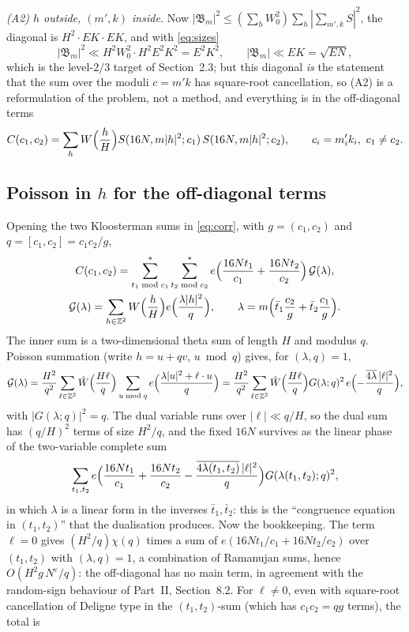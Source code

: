 \documentclass[11pt,a4paper]{article}
\theoremstyle{remark}
\theoremstyle{definition}
\newcommand{\Z}{\mathbb Z}
\newcommand{\e}{\varepsilon}
\begin{document}
\emph{(A2) $h$ outside, $(m',k)$ inside.} Now $|\mathfrak B_m|^2\le(\sum_hW_0^2)\sum_h|\sum_{m',k}S|^2$, the diagonal is $H^2\cdot EK\cdot EK$, and with \eqref{eq:sizes}
\[
|\mathfrak B_m|^2\ll H^2W_0^2\cdot H^2E^2K^2=E^2K^2,\qquad|\mathfrak B_m|\ll EK=\sqrt{EN},
\]
which is the level-$2/3$ target of Section~2.3; but this diagonal \emph{is} the statement that the sum over the moduli $c=m'k$ has square-root cancellation, so (A2) is a reformulation of the problem, not a method, and everything is in the off-diagonal terms
\begin{equation}\label{eq:corr}
C(c_1,c_2)=\sum_hW\Bigl(\frac hH\Bigr)S(16N,m|h|^2;c_1)\,S(16N,m|h|^2;c_2),\qquad c_i=m'_ik_i,\ c_1\ne c_2 .
\end{equation}

\subsection{Poisson in $h$ for the off-diagonal terms}
Opening the two Kloosterman sums in \eqref{eq:corr}, with $g=(c_1,c_2)$ and $q=[c_1,c_2]=c_1c_2/g$,
\begin{gather*}
C(c_1,c_2)=\sum_{t_1\bmod c_1}^*\sum_{t_2\bmod c_2}^*e\Bigl(\frac{16Nt_1}{c_1}+\frac{16Nt_2}{c_2}\Bigr)\,\mathcal G(\lambda),\\
\mathcal G(\lambda)=\sum_{h\in\Z^2}W\Bigl(\frac hH\Bigr)e\Bigl(\frac{\lambda|h|^2}{q}\Bigr),\qquad \lambda=m\Bigl(\bar t_1\frac{c_2}g+\bar t_2\frac{c_1}g\Bigr).
\end{gather*}
The inner sum is a two-dimensional theta sum of length $H$ and modulus $q$. Poisson summation (write $h=u+qv$, $u\bmod q$) gives, for $(\lambda,q)=1$,
\[
\mathcal G(\lambda)=\frac{H^2}{q^2}\sum_{\ell\in\Z^2}\hat W\Bigl(\frac{H\ell}q\Bigr)\sum_{u\bmod q}e\Bigl(\frac{\lambda|u|^2+\ell\cdot u}{q}\Bigr)=\frac{H^2}{q^2}\sum_{\ell\in\Z^2}\hat W\Bigl(\frac{H\ell}q\Bigr)G(\lambda;q)^2\,e\Bigl(-\frac{\overline{4\lambda}\,|\ell|^2}{q}\Bigr),
\]
with $|G(\lambda;q)|^2=q$. The dual variable runs over $|\ell|\ll q/H$, so the dual sum has $(q/H)^2$ terms of size $H^2/q$, and the fixed $16N$ survives as the linear phase of the two-variable complete sum
\[
\sum_{t_1,t_2}e\Bigl(\frac{16Nt_1}{c_1}+\frac{16Nt_2}{c_2}-\frac{\overline{4\lambda(t_1,t_2)}\,|\ell|^2}{q}\Bigr)G(\lambda(t_1,t_2);q)^2 ,
\]
in which $\lambda$ is a linear form in the inverses $\bar t_1,\bar t_2$: this is the ``congruence equation in $(t_1,t_2)$'' that the dualisation produces. Now the bookkeeping. The term $\ell=0$ gives $(H^2/q)\chi(q)$ times a sum of $e(16Nt_1/c_1+16Nt_2/c_2)$ over $(t_1,t_2)$ with $(\lambda,q)=1$, a combination of Ramanujan sums, hence $O(H^2g\,N^\e/q)$: the off-diagonal has no main term, in agreement with the random-sign behaviour of Part~II, Section~8.2. For $\ell\ne0$, even with square-root cancellation of Deligne type in the $(t_1,t_2)$-sum (which has $c_1c_2=qg$ terms), the total is
\end{document}
